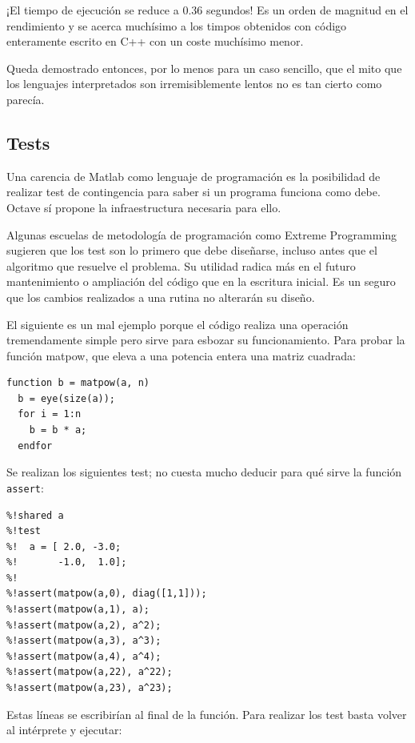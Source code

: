 \documentclass[10pt,letterpaper,conference]{ieeeconfspanish}
\begin{document}
¡El tiempo de ejecución se reduce a 0.36 segundos! Es un orden de
magnitud en el rendimiento y se acerca muchísimo a los timpos
obtenidos con código enteramente escrito en C++ con un coste muchísimo
menor.

Queda demostrado entonces, por lo menos para un caso sencillo, que el
mito que los lenguajes interpretados son irremisiblemente lentos no
es tan cierto como parecía.



\hypertarget{tests}{}
\subsection*{Tests}

Una carencia de Matlab como lenguaje de programación es la posibilidad
de realizar test de contingencia para saber si un programa funciona
como debe.  Octave sí propone la infraestructura necesaria para ello.

Algunas escuelas de metodología de programación como Extreme
Programming sugieren que los test son lo primero que debe diseñarse,
incluso antes que el algoritmo que resuelve el problema. Su utilidad
radica más en el futuro mantenimiento o ampliación del código que en
la escritura inicial.  Es un seguro que los cambios realizados a una
rutina no alterarán su diseño.

El siguiente es un mal ejemplo porque el código realiza una operación
tremendamente simple pero sirve para esbozar su funcionamiento.  Para
probar la función matpow, que eleva a una potencia entera una matriz
cuadrada:
\begin{verbatim}
function b = matpow(a, n)
  b = eye(size(a));
  for i = 1:n
    b = b * a;
  endfor
\end{verbatim}

Se realizan los siguientes test; no cuesta mucho deducir para qué
sirve la función \texttt{assert}:

\begin{verbatim}
%!shared a
%!test
%!  a = [ 2.0, -3.0;
%!       -1.0,  1.0];
%!
%!assert(matpow(a,0), diag([1,1]));
%!assert(matpow(a,1), a);
%!assert(matpow(a,2), a^2);
%!assert(matpow(a,3), a^3);
%!assert(matpow(a,4), a^4);
%!assert(matpow(a,22), a^22);
%!assert(matpow(a,23), a^23);
\end{verbatim}

Estas líneas se escribirían al final de la función.  Para realizar los
test basta volver al intérprete y ejecutar:
\end{document}
